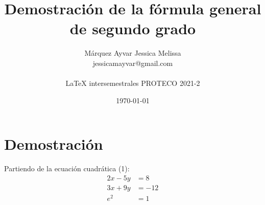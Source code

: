 \documentclass{article}
\title{Demostración de la fórmula general de segundo grado}
\author{\Large{Márquez Ayvar Jessica Melissa} \\ 
        jessicamayvar@gmail.com\\ \\
        \small{{\LaTeX} intersemestrales PROTECO 2021-2}}
\date{\small{\today}}
\begin{document}
    \maketitle

\section*{Demostración}

Partiendo de la ecuación cuadrática (1): \\

\begin{align} 
2x - 5y &=  8 \\ 
3x + 9y &=  -12\\
  e^{2} &= 1
\end{align}

    
    
    
    
    
    
    
    
\end{document}
